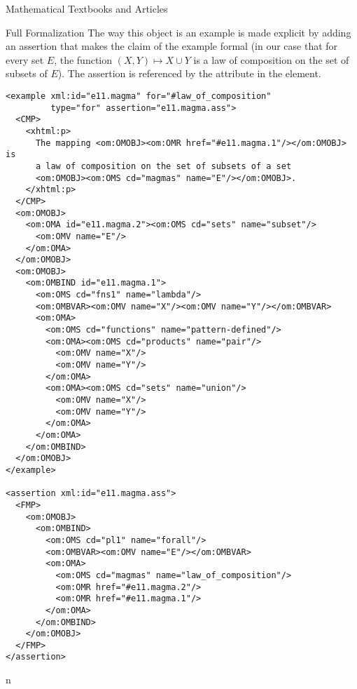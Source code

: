 \begin{tchapter}[id=algebra,short=Textbooks and Articles]{Mathematical Textbooks and Articles}
\begin{tsection}[id=formalization]{Full Formalization}
The way this object is an example is made explicit by adding an assertion that makes the
claim of the example formal (in our case that for every set $E$, the function
$(X,Y)\mapsto X\cup Y$ is a law of composition on the set of subsets of $E$). The
assertion is referenced by the {} attribute in the
{} element.

\begin{lstlisting}[label=lst:magma-formal-examples,frame=topline,
    caption={A  formalized magma example},
    index={example,assertion,CMP,FMP,OMOBJ,OMS,OMA,OMV}]
<example xml:id="e11.magma" for="#law_of_composition" 
         type="for" assertion="e11.magma.ass">
  <CMP>
    <xhtml:p>
      The mapping <om:OMOBJ><om:OMR href="#e11.magma.1"/></om:OMOBJ> is 
      a law of composition on the set of subsets of a set 
      <om:OMOBJ><om:OMS cd="magmas" name="E"/></om:OMOBJ>.
    </xhtml:p>
  </CMP>
  <om:OMOBJ>
    <om:OMA id="e11.magma.2"><om:OMS cd="sets" name="subset"/>
      <om:OMV name="E"/>
    </om:OMA>
  </om:OMOBJ>
  <om:OMOBJ>
    <om:OMBIND id="e11.magma.1">
      <om:OMS cd="fns1" name="lambda"/>
      <om:OMBVAR><om:OMV name="X"/><om:OMV name="Y"/></om:OMBVAR>
      <om:OMA>
        <om:OMS cd="functions" name="pattern-defined"/>
        <om:OMA><om:OMS cd="products" name="pair"/>
          <om:OMV name="X"/>
          <om:OMV name="Y"/>
        </om:OMA>
        <om:OMA><om:OMS cd="sets" name="union"/>
          <om:OMV name="X"/>
          <om:OMV name="Y"/>
        </om:OMA>
      </om:OMA>
    </om:OMBIND>
  </om:OMOBJ>
</example>

<assertion xml:id="e11.magma.ass">
  <FMP>
    <om:OMOBJ>
      <om:OMBIND>
        <om:OMS cd="pl1" name="forall"/>
        <om:OMBVAR><om:OMV name="E"/></om:OMBVAR>
        <om:OMA>
          <om:OMS cd="magmas" name="law_of_composition"/>
          <om:OMR href="#e11.magma.2"/>
          <om:OMR href="#e11.magma.1"/>
        </om:OMA>
      </om:OMBIND>
    </om:OMOBJ>
  </FMP>
</assertion>
\end{lstlisting}          
\end{tsection}
\end{tchapter} 
n%


